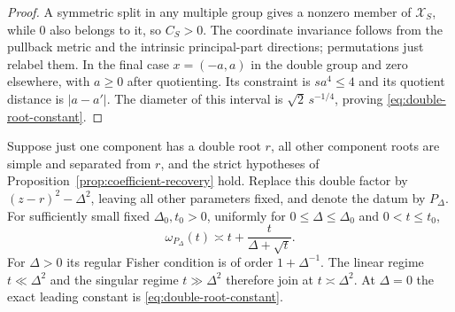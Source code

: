 \begin{proof}
A symmetric split in any multiple group gives a nonzero member of
$\mathcal X_S$, while $0$ also belongs to it, so $C_S>0$. The
coordinate invariance follows from the pullback metric and the
intrinsic principal-part directions; permutations just relabel them.
In the final case $x=(-a,a)$ in the double group and zero elsewhere,
with $a\ge0$ after quotienting. Its constraint is $s a^4\le4$ and
its quotient distance is $|a-a'|$. The diameter of this interval is
$\sqrt2\,s^{-1/4}$, proving \eqref{eq:double-root-constant}.
\end{proof}

\begin{theorem}
\label{thm:double-root-crossover}
Suppose just one component has a double root $r$, all other component
roots are simple and separated from $r$, and the strict hypotheses of
Proposition~\ref{prop:coefficient-recovery} hold. Replace this double
factor by $(z-r)^2-\Delta^2$, leaving all other parameters fixed,
and denote the datum by $P_\Delta$. For sufficiently small fixed
$\Delta_0,t_0>0$, uniformly for $0\le\Delta\le\Delta_0$ and
$0<t\le t_0$,
\begin{equation}\label{eq:double-root-crossover}
 \omega_{P_\Delta}(t)\asymp
             t+\frac{t}{\Delta+\sqrt t}.
\end{equation}
For $\Delta>0$ its regular Fisher condition is of order
$1+\Delta^{-1}$. The linear regime $t\ll\Delta^2$ and the singular
regime $t\gg\Delta^2$ therefore join at $t\asymp\Delta^2$.
At $\Delta=0$ the exact leading constant is
\eqref{eq:double-root-constant}.
\end{theorem}
